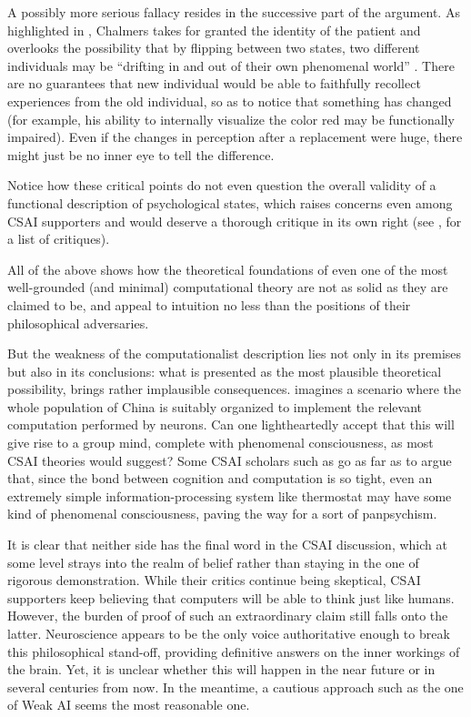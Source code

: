 \documentclass{article}
\begin{document}
A possibly more serious fallacy resides in the successive part of the argument. As highlighted in \citep{van1998let}, Chalmers takes for granted the identity of the patient and overlooks the possibility that by flipping between two states, two different individuals may be ``drifting in and out of their own phenomenal world'' \citep[4.]{van1998let}. There are no guarantees that new individual would be able to faithfully recollect experiences from the old individual, so as to notice that something has changed (for example, his ability to internally visualize the color red may be functionally impaired). Even if the changes in perception after a replacement were huge, there might just be no inner eye to tell the difference.

Notice how these critical points do not even question the overall validity of a functional description of psychological states, which raises concerns even among CSAI supporters and would deserve a thorough critique in its own right (see \citealp{sep-computational-mind}, for a list of critiques).

All of the above shows how the theoretical foundations of even one of the most well-grounded (and minimal) computational theory are not as solid as they are claimed to be, and appeal to intuition no less than the positions of their philosophical adversaries.

But the weakness of the computationalist description lies not only in its premises but also in its conclusions: what is presented as the most plausible theoretical possibility, brings rather implausible consequences. \cite{block1980troubles} imagines a scenario where the whole population of China is suitably organized to implement the relevant computation performed by neurons. Can one lightheartedly accept that this will give rise to a group mind, complete with phenomenal consciousness, as most CSAI theories would suggest? Some CSAI scholars such as \cite{chalmers1996conscious} go as far as to argue that, since the bond between cognition and computation is so tight, even an extremely simple information-processing system like thermostat may have some kind of phenomenal consciousness, paving the way for a sort of panpsychism.

It is clear that neither side has the final word in the CSAI discussion, which at some level strays into the realm of belief rather than staying in the one of rigorous demonstration. While their critics continue being skeptical, CSAI supporters keep believing that computers will be able to think just like humans. However, the burden of proof of such an extraordinary claim still falls onto the latter. Neuroscience appears to be the only voice authoritative enough to break this philosophical stand-off, providing definitive answers on the inner workings of the brain. Yet, it is unclear whether this will happen in the near future or in several centuries from now. In the meantime, a cautious approach such as the one of Weak AI seems the most reasonable one.
\end{document}
